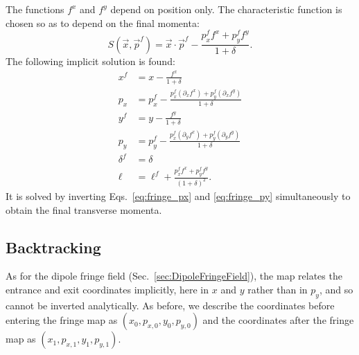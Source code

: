 The functions $f^x$ and $f^y$ depend on position only.
The characteristic function is chosen so as to depend on the final momenta:
\begin{equation}
S(\vec{x}, \vec{p}^f) = \vec{x} \cdot \vec{p}^f - \frac{p_x^f f^x + p_y^f f^y}{1+\delta}.
\label{eq:characteristic}
\end{equation}
The following implicit solution is found:
\begin{subequations}
\label{eq:system}
\begin{align}
x^f &= x - \frac{f^x}{1+\delta} \label{eq:xf} \\[0.5ex]
p_x &= p_x^f - \frac{p_x^f (\partial_x f^x) + p_y^f (\partial_x f^y)}{1+\delta} \label{eq:fringe_px} \\[0.5ex]
y^f &= y - \frac{f^y}{1+\delta} \label{eq:yf} \\[0.5ex]
p_y &= p_y^f - \frac{p_x^f (\partial_y f^x) + p_y^f (\partial_y f^y)}{1+\delta} \label{eq:fringe_py} \\[0.5ex]
\delta^f &= \delta \label{eq:deltaf} \\[0.5ex]
\ell &= \ell^f + \frac{p_x^f f^x + p_y^f f^y}{(1+\delta)^2}. \label{eq:l}
\end{align}
\end{subequations}
It is solved by inverting Eqs.~\eqref{eq:fringe_px} and \eqref{eq:fringe_py}
simultaneously to obtain the final transverse momenta.

\subsection{Backtracking}
As for the dipole fringe field (Sec.~\ref{sec:DipoleFringeField}), the map relates the
entrance and exit coordinates implicitly, here in $x$ and $y$ rather than in $p_y$, and so
cannot be inverted analytically. As before, we describe the coordinates before entering the
fringe map as $(x_0, p_{x,0}, y_0, p_{y,0})$ and the coordinates after the fringe map as
$(x_1, p_{x,1}, y_1, p_{y,1})$.

